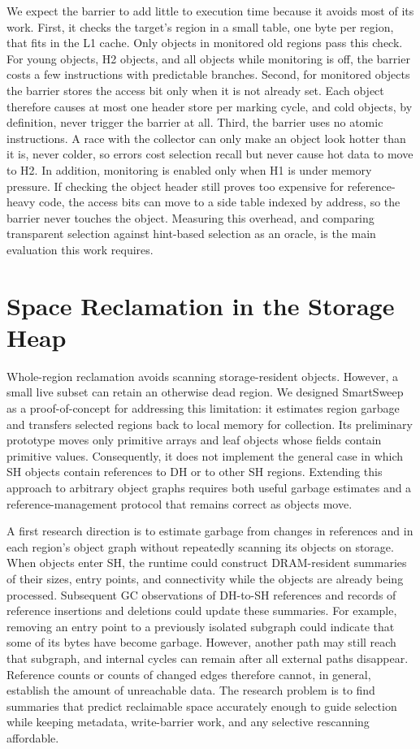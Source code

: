 We expect the barrier to add little to execution time because it avoids most of its work.
First, it checks the target's region in a small table, one byte per region, that fits in the L1 cache.
Only objects in monitored old regions pass this check.
For young objects, H2 objects, and all objects while monitoring is off, the barrier costs a few instructions with predictable branches.
Second, for monitored objects the barrier stores the access bit only when it is not already set.
Each object therefore causes at most one header store per marking cycle, and cold objects, by definition, never trigger the barrier at all.
Third, the barrier uses no atomic instructions.
A race with the collector can only make an object look hotter than it is, never colder, so errors cost selection recall but never cause hot data to move to H2.
In addition, monitoring is enabled only when H1 is under memory pressure.
If checking the object header still proves too expensive for reference-heavy code, the access bits can move to a side table indexed by address, so the barrier never touches the object.
Measuring this overhead, and comparing transparent selection against hint-based selection as an oracle, is the main evaluation this work requires.

\section{Space Reclamation in the Storage Heap}
\label{sec:future_reclamation}

Whole-region reclamation avoids scanning storage-resident objects.
However, a small live subset can retain an otherwise dead region.
We designed SmartSweep~\cite{kolokasis:smartsweep} as a proof-of-concept for addressing this limitation: it estimates region garbage and transfers selected regions back to local memory for collection.
Its preliminary prototype moves only primitive arrays and leaf objects whose fields contain primitive values.
Consequently, it does not implement the general case in which SH objects contain references to DH or to other SH regions.
Extending this approach to arbitrary object graphs requires both useful garbage estimates and a reference-management protocol that remains correct as objects move.

A first research direction is to estimate garbage from changes in references and in each region's object graph without repeatedly scanning its objects on storage.
When objects enter SH, the runtime could construct DRAM-resident summaries of their sizes, entry points, and connectivity while the objects are already being processed.
Subsequent GC observations of DH-to-SH references and records of reference insertions and deletions could update these summaries.
For example, removing an entry point to a previously isolated subgraph could indicate that some of its bytes have become garbage.
However, another path may still reach that subgraph, and internal cycles can remain after all external paths disappear.
Reference counts or counts of changed edges therefore cannot, in general, establish the amount of unreachable data.
The research problem is to find summaries that predict reclaimable space accurately enough to guide selection while keeping metadata, write-barrier work, and any selective rescanning affordable.

